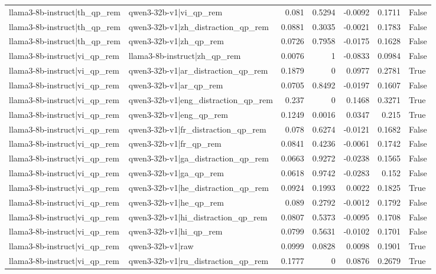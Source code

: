 \begin{table}
\begin{tabular}{l l r r r r l}
llama3-8b-instruct|th_qp_rem & qwen3-32b-v1|vi_qp_rem & 0.081 & 0.5294 & -0.0092 & 0.1711 & False \\
llama3-8b-instruct|th_qp_rem & qwen3-32b-v1|zh_distraction_qp_rem & 0.0881 & 0.3035 & -0.0021 & 0.1783 & False \\
llama3-8b-instruct|th_qp_rem & qwen3-32b-v1|zh_qp_rem & 0.0726 & 0.7958 & -0.0175 & 0.1628 & False \\
llama3-8b-instruct|vi_qp_rem & llama3-8b-instruct|zh_qp_rem & 0.0076 & 1 & -0.0833 & 0.0984 & False \\
llama3-8b-instruct|vi_qp_rem & qwen3-32b-v1|ar_distraction_qp_rem & 0.1879 & 0 & 0.0977 & 0.2781 & True \\
llama3-8b-instruct|vi_qp_rem & qwen3-32b-v1|ar_qp_rem & 0.0705 & 0.8492 & -0.0197 & 0.1607 & False \\
llama3-8b-instruct|vi_qp_rem & qwen3-32b-v1|eng_distraction_qp_rem & 0.237 & 0 & 0.1468 & 0.3271 & True \\
llama3-8b-instruct|vi_qp_rem & qwen3-32b-v1|eng_qp_rem & 0.1249 & 0.0016 & 0.0347 & 0.215 & True \\
llama3-8b-instruct|vi_qp_rem & qwen3-32b-v1|fr_distraction_qp_rem & 0.078 & 0.6274 & -0.0121 & 0.1682 & False \\
llama3-8b-instruct|vi_qp_rem & qwen3-32b-v1|fr_qp_rem & 0.0841 & 0.4236 & -0.0061 & 0.1742 & False \\
llama3-8b-instruct|vi_qp_rem & qwen3-32b-v1|ga_distraction_qp_rem & 0.0663 & 0.9272 & -0.0238 & 0.1565 & False \\
llama3-8b-instruct|vi_qp_rem & qwen3-32b-v1|ga_qp_rem & 0.0618 & 0.9742 & -0.0283 & 0.152 & False \\
llama3-8b-instruct|vi_qp_rem & qwen3-32b-v1|he_distraction_qp_rem & 0.0924 & 0.1993 & 0.0022 & 0.1825 & True \\
llama3-8b-instruct|vi_qp_rem & qwen3-32b-v1|he_qp_rem & 0.089 & 0.2792 & -0.0012 & 0.1792 & False \\
llama3-8b-instruct|vi_qp_rem & qwen3-32b-v1|hi_distraction_qp_rem & 0.0807 & 0.5373 & -0.0095 & 0.1708 & False \\
llama3-8b-instruct|vi_qp_rem & qwen3-32b-v1|hi_qp_rem & 0.0799 & 0.5631 & -0.0102 & 0.1701 & False \\
llama3-8b-instruct|vi_qp_rem & qwen3-32b-v1|raw & 0.0999 & 0.0828 & 0.0098 & 0.1901 & True \\
llama3-8b-instruct|vi_qp_rem & qwen3-32b-v1|ru_distraction_qp_rem & 0.1777 & 0 & 0.0876 & 0.2679 & True \\

\end{tabular}
\end{table}
